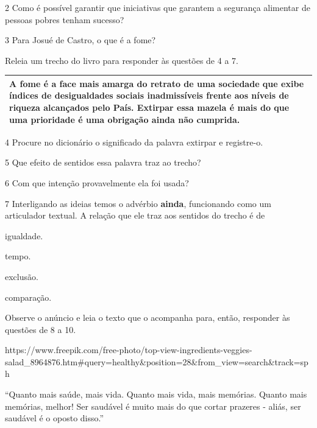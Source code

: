\begin{itemize}
\begin{itemize}
\num{2} Como é possível garantir que iniciativas que garantem a
segurança alimentar de pessoas pobres tenham sucesso? 

\num{3} Para Josué de Castro, o que é a fome? 

Releia um trecho do livro para responder às questões de 4 a 7.

\begin{longtable}[]{@{}l@{}}
\toprule
A fome é a face mais amarga do retrato de uma sociedade que exibe
índices de desigualdades sociais inadmissíveis frente aos níveis de
riqueza alcançados pelo País. Extirpar essa mazela é mais do que uma
prioridade é uma obrigação ainda não cumprida.\tabularnewline
\bottomrule
\end{longtable}

\num{4} Procure no dicionário o significado da palavra extirpar e
registre-o.  

\num{5} Que efeito de sentidos essa palavra traz ao trecho? 

\num{6} Com que intenção provavelmente ela foi usada? 

\num{7} Interligando as ideias temos o advérbio \textbf{ainda},
funcionando como um articulador textual. A relação que ele traz aos
sentidos do trecho é de

 igualdade.

 tempo.

 exclusão.

 comparação.

Observe o anúncio e leia o texto que o acompanha para, então, responder
às questões de 8 a 10.

https://www.freepik.com/free-photo/top-view-ingredients-veggies-salad\_8964876.htm\#query=healthy\&position=28\&from\_view=search\&track=sph

``Quanto mais saúde, mais vida. Quanto mais vida, mais memórias. Quanto
mais memórias, melhor! Ser saudável é muito mais do que cortar prazeres
- aliás, ser saudável é o oposto disso.''


\end{itemize}
\end{itemize}
